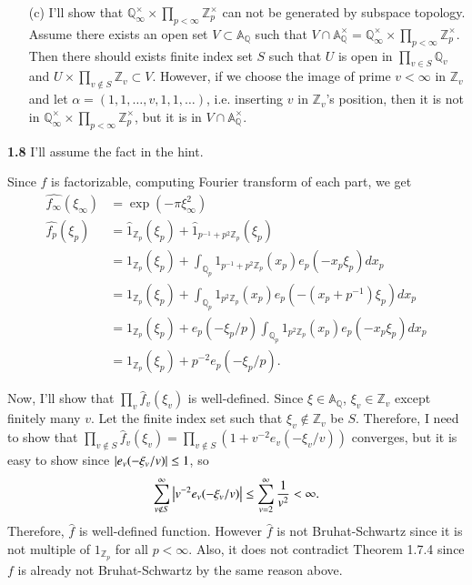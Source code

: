 \documentclass[a4paper, 12pt]{article}
\theoremstyle{Mydefinition}
\theoremstyle{Mytheorem}
\begin{document}
\begin{enumerate}
\item[(c)] I'll show that $\mathbb{Q}_\infty^\times \times \prod_{p<\infty}\mathbb{Z}_p^\times$ can not be generated by subspace topology. Assume there exists an open set $V\subset \mathbb{A}_\mathbb{Q}$ such that $V\cap \mathbb{A}_\mathbb{Q}^\times = \mathbb{Q}_\infty^\times \times \prod_{p<\infty}\mathbb{Z}_p^\times$. Then there should exists finite index set $S$ such that $U$ is open in $\prod_{v\in S} \mathbb{Q}_v$ and $U\times \prod_{v\not\in S}\mathbb{Z}_v \subset V$. However, if we choose the image of prime $v<\infty$ in $\mathbb{Z}_v$ and let $\alpha = (1,1,\ldots, v, 1,1,\ldots)$, i.e. inserting $v$ in $\mathbb{Z}_v$'s position, then it is not in $\mathbb{Q}_\infty^\times \times \prod_{p<\infty}\mathbb{Z}_p^\times$, but it is in $V\cap \mathbb{A}_\mathbb{Q}^\times$.
\end{enumerate}

\noindent \textbf{1.8}
I'll assume the fact in the hint.

Since $f$ is factorizable, computing Fourier transform of each part, we get
\begin{equation}
\begin{split}
    \hat{f_\infty}(\xi_\infty) &= \exp(-\pi \xi_\infty^2)\\
    \hat{f_p}(\xi_p) &= \hat{1}_{\mathbb{Z}_p}(\xi_p) + \hat{1}_{p^{-1}+p^2\mathbb{Z}_p}(\xi_p)\\
    &=1_{\mathbb{Z}_p}(\xi_p) + \int_{\mathbb{Q}_p} 1_{p^{-1}+p^2\mathbb{Z}_p}(x_p)e_p(-x_p\xi_p)dx_p\\
    &=1_{\mathbb{Z}_p}(\xi_p) + \int_{\mathbb{Q}_p} 1_{p^2\mathbb{Z}_p}(x_p)e_p(-(x_p+p^{-1})\xi_p)dx_p\\
    &=1_{\mathbb{Z}_p}(\xi_p) + e_p(-\xi_p/p)\int_{\mathbb{Q}_p} 1_{p^2\mathbb{Z}_p}(x_p)e_p(-x_p\xi_p)dx_p\\
    &=1_{\mathbb{Z}_p}(\xi_p) + p^{-2}e_p(-\xi_p/p).
\end{split}
\end{equation}

Now, I'll show that $\prod_{v}\hat{f}_v(\xi_v)$ is well-defined. Since $\xi\in\mathbb{A}_\mathbb{Q}$, $\xi_v\in \mathbb{Z}_v$ except finitely many $v$. Let the finite index set such that $\xi_v\not\in \mathbb{Z}_v$ be $S$. Therefore, I need to show that $\prod_{v\not\in S}\hat{f}_v(\xi_v) = \prod_{v\not\in S}(1+v^{-2}e_v(-\xi_v/v))$ converges, but it is easy to show since $\abs{e_v(-\xi_v/v)}\leq 1$, so
\begin{equation}
    \sum_{v\not\in S}^\infty \abs{v^{-2}e_v(-\xi_v/v)}\leq \sum_{v=2}^\infty \frac{1}{v^2}<\infty.
\end{equation}
Therefore, $\hat{f}$ is well-defined function. However $\hat{f}$ is not Bruhat-Schwartz since it is not multiple of $1_{\mathbb{Z}_p}$ for all $p<\infty$. Also, it does not contradict Theorem 1.7.4 since $f$ is already not Bruhat-Schwartz by the same reason above.\\
\end{document}
